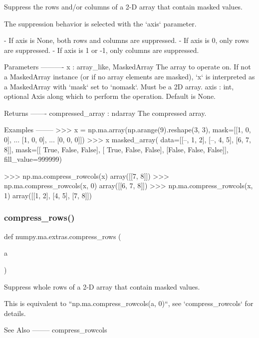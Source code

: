 \begin{DoxyVerb}Suppress the rows and/or columns of a 2-D array that contain
masked values.

The suppression behavior is selected with the `axis` parameter.

- If axis is None, both rows and columns are suppressed.
- If axis is 0, only rows are suppressed.
- If axis is 1 or -1, only columns are suppressed.

Parameters
----------
x : array_like, MaskedArray
    The array to operate on.  If not a MaskedArray instance (or if no array
    elements are masked), `x` is interpreted as a MaskedArray with
    `mask` set to `nomask`. Must be a 2D array.
axis : int, optional
    Axis along which to perform the operation. Default is None.

Returns
-------
compressed_array : ndarray
    The compressed array.

Examples
--------
>>> x = np.ma.array(np.arange(9).reshape(3, 3), mask=[[1, 0, 0],
...                                                   [1, 0, 0],
...                                                   [0, 0, 0]])
>>> x
masked_array(
  data=[[--, 1, 2],
        [--, 4, 5],
        [6, 7, 8]],
  mask=[[ True, False, False],
        [ True, False, False],
        [False, False, False]],
  fill_value=999999)

>>> np.ma.compress_rowcols(x)
array([[7, 8]])
>>> np.ma.compress_rowcols(x, 0)
array([[6, 7, 8]])
>>> np.ma.compress_rowcols(x, 1)
array([[1, 2],
       [4, 5],
       [7, 8]])\end{DoxyVerb}
 \mbox{\label{namespacenumpy_1_1ma_1_1extras_a61282f81d609b69bc6012d36ac1d1e4f}} 
\subsubsection{\texorpdfstring{compress\+\_\+rows()}{compress\_rows()}}
{\footnotesize\ttfamily def numpy.\+ma.\+extras.\+compress\+\_\+rows (\begin{DoxyParamCaption}\item[{}]{a }\end{DoxyParamCaption})}

\begin{DoxyVerb}Suppress whole rows of a 2-D array that contain masked values.

This is equivalent to ``np.ma.compress_rowcols(a, 0)``, see
`compress_rowcols` for details.

See Also
--------
compress_rowcols\end{DoxyVerb}
 \mbox{\label{namespacenumpy_1_1ma_1_1extras_ad9d215f62082d634dbee7aecce6e265c}} 
